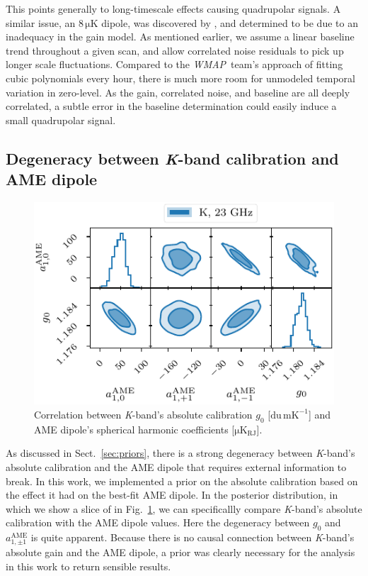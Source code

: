 \documentclass[twocolumn]{../../common/aa}
\def\WMAP{\emph{WMAP}}
\def\WMAPnine{\emph{WMAP9}}
\newcommand{\K}[0]{\textit K}
\begin{document}
This points generally to long-timescale effects causing quadrupolar signals. A similar issue, an $8\,\mathrm{\mu K}$ dipole,  was discovered by \citet{jarosik2007}, and determined to be due to an inadequacy in the gain model. As mentioned earlier, we assume a linear baseline trend throughout a given scan, and allow correlated noise residuals to pick up longer scale fluctuations. Compared to the \WMAP\ team's approach of fitting cubic polynomials every hour, there is much more room for unmodeled temporal variation in zero-level. As the gain, correlated noise, and baseline are all deeply correlated, a subtle error in the baseline determination could easily induce a small quadrupolar signal.



\subsection{Degeneracy between \K-band calibration and AME dipole}
\label{sec:ame_Kband}

\begin{figure}
	\includegraphics[width=\columnwidth]{figures/ame_dipole_vs_g0_K.pdf}
	\caption{Correlation between \K-band's absolute calibration $g_0$ [$\mathrm{du\,mK^{-1}}$] and AME dipole's spherical harmonic coefficients [$\mathrm{\mu K_{RJ}}$].}
	\label{fig:ame_g0}
\end{figure}


As discussed in Sect.~\ref{sec:priors}, there is a strong degeneracy between \K-band's absolute calibration and the AME dipole that requires external information to break.  In this work, we implemented a prior on the absolute calibration based on the effect it had on the best-fit AME dipole. In the posterior distribution, in which we show a slice of in Fig.~\ref{fig:ame_g0},  we can specificallly  compare \K-band's absolute calibration with the AME dipole values. Here the degeneracy between $g_0$ and $a_{1,\pm1}^\mathrm{AME}$ is quite apparent. Because there is no causal connection between \K-band's absolute gain and the AME dipole, a prior was clearly necessary for the analysis in this work to return sensible results.
\end{document}
